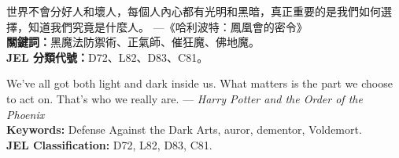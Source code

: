 \begin{abstractzh}
\noindent 
世界不會分好人和壞人，每個人內心都有光明和黑暗，真正重要的是我們如何選擇，知道我們究竟是什麼人。
---《哈利波特：鳳凰會的密令》\\[10mm]
{\bf 關鍵詞：}黑魔法防禦術、正氣師、催狂魔、佛地魔。\\
{\bf JEL 分類代號：}D72、L82、D83、C81。
\end{abstractzh}

\begin{abstracten}
\noindent 
We've all got both light and dark inside us. 
What matters is the part we choose to act on. 
That's who we really are.
--- {\it Harry Potter and the Order of the Phoenix}\\[10mm]
{\bf Keywords:} Defense Against the Dark Arts, auror, dementor, Voldemort.\\
{\bf JEL Classification:} D72, L82, D83, C81.
\end{abstracten}

